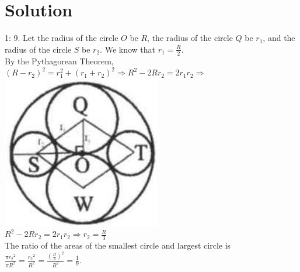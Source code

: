 \documentclass{article}
\begin{document}
\section*{Solution}
1: 9.
Let the radius of the circle \(O\) be \(R\), the radius of the circle \(Q\) be \(r_{1}\), and the radius of the circle \(S\) be \(r_{2}\). We know that \(r_{1}=\frac{R}{2}\).\\
By the Pythagorean Theorem,\\
\(\left(R-r_{2}\right)^{2}=r_{1}^{2}+\left(r_{1}+r_{2}\right)^{2} \Rightarrow R^{2}-2 R r_{2}=2 r_{1} r_{2} \Rightarrow\)\\
\centering
\includegraphics[width=\textwidth]{images/reasoning_image_1.jpg}\\
\(R^{2}-2 R r_{2}=2 r_{1} r_{2} \Rightarrow r_{2}=\frac{R}{3}\)\\
The ratio of the areas of the smallest circle and largest circle is\\
\(\frac{\pi r_{2}{ }^{2}}{\pi R^{2}}=\frac{r_{2}{ }^{2}}{R^{2}}=\frac{\left(\frac{R}{3}\right)^{2}}{R^{2}}=\frac{1}{9}\).\\
\end{document}
